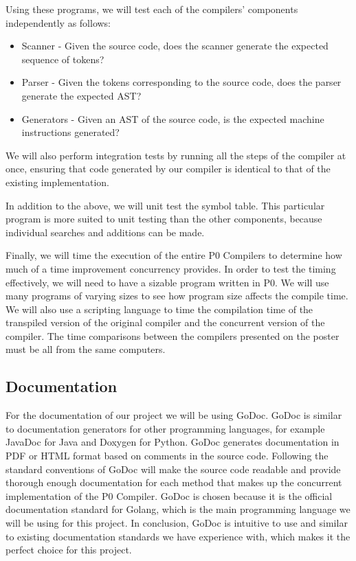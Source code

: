 \documentclass{article}
\begin{document}
Using these programs, we will test each of the compilers' components independently as follows:

\begin{itemize}
  \item Scanner - Given the source code, does the scanner generate the expected
    sequence of tokens?
  \item Parser - Given the tokens corresponding to the source code, does the
    parser generate the expected AST?
  \item Generators - Given an AST of the source code, is the expected machine
    instructions generated?
\end{itemize}

We will also perform integration tests by running all the steps of the compiler
at once, ensuring that code generated by our compiler is identical to that of
the existing implementation.

In addition to the above, we will unit test the symbol table.
This particular program is more suited to unit testing than the other components,
because individual searches and additions can be made.

Finally, we will time the execution of the entire P0 Compilers to determine how much of a
time improvement concurrency provides.
In order to test the timing effectively, we will need to have a sizable program
written in P0.
We will use many programs of varying sizes to see how program size
affects the compile time.
We will also use a scripting language to time the compilation time of the transpiled
version of the original compiler and the concurrent version of the compiler.
The time comparisons between the compilers presented on the poster must be all
from the same computers.

\subsection{Documentation}

For the documentation of our project we will be using GoDoc. GoDoc is similar to documentation 
generators for other programming languages, for example JavaDoc for Java and Doxygen for Python. 
GoDoc generates documentation in PDF or HTML format based on comments in the source code. 
Following the standard conventions of GoDoc will make the source code readable and provide thorough 
enough documentation for each method that makes up the concurrent implementation of the P0 Compiler. GoDoc is chosen because it is the official documentation standard for Golang, 
which is the main programming language we will be using for this project. 
 In conclusion, GoDoc is intuitive to use and similar to existing documentation standards we have experience with, 
 which makes it the perfect choice for this project.
 
\end{document}
